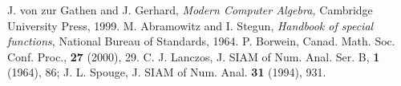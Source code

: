 \documentclass{llncs}
\begin{document}
\begin{thebibliography}{1}
J. von zur Gathen and J. Gerhard, \emph{Modern Computer Algebra,}
Cambridge University Press, 1999.
M. Abramowitz and I. Stegun, \emph{Handbook of special functions},
National Bureau of Standards, 1964.
P. Borwein, Canad. Math. Soc. Conf. Proc., \textbf{27} (2000), 29.
C. J. Lanczos, J. SIAM of Num. Anal. Ser. B, \textbf{1} (1964), 86;
J. L. Spouge, J. SIAM of Num. Anal. \textbf{31} (1994), 931.\end{thebibliography}
\end{document}
